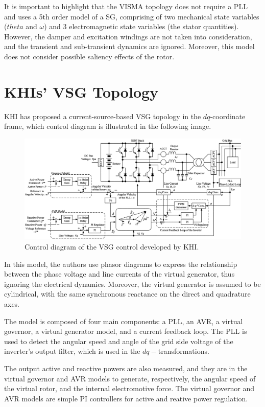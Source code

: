 It is important to highlight that the VISMA topology does not require a PLL and
uses a 5th order model of a SG, comprising of two mechanical state variables
($theta$ and $\omega$) and 3 electromagnetic state variables (the stator
quantities). However, the damper and excitation windings are not taken into
consideration, and the transient and sub-transient dynamics are ignored.
Moreover, this model does not consider possible saliency effects of the rotor.

\section{KHIs' VSG Topology}
KHI has proposed a current-source-based VSG topology in the $dq$-coordinate
frame\cite{hirase2013grid}, which control diagram is illustrated in the
following image.

\begin{figure}[h!]
    \centering
    \includegraphics[width=14cm]{images/KHI.png}
    \caption{Control diagram of the VSG control developed by KHI\cite{hirase2013grid}.}
    \label{fig:KHI}
\end{figure}

In this model, the authors use phasor diagrams to express the relationship
between the phase voltage and line currents of the virtual generator, thus
ignoring the electrical dynamics. Moreover, the virtual generator is assumed to
be cylindrical, with the same synchronous reactance on the direct and quadrature
axes.

The model is composed of four main components: a PLL, an AVR, a virtual
governor, a virtual generator model, and a current feedback loop. The PLL is
used to detect the angular speed and angle of the grid side voltage of the
inverter's output filter, which is used in the $dq-$transformations.

The output active and reactive powers are also measured, and they are in the
virtual governor and AVR models to generate, respectively, the angular speed of
the virtual rotor, and the internal electromotive force. The virtual governor
and AVR models are simple PI controllers for active and reative power
regulation.

